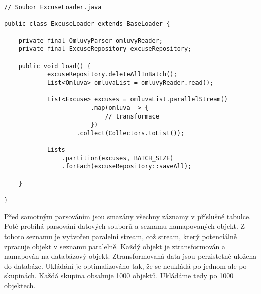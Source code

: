 \begin{lstlisting}[caption={Transformace objektu Omluva na databázový objekt Excuse}, tabsize=2]
// Soubor ExcuseLoader.java
	
public class ExcuseLoader extends BaseLoader {

    private final OmluvyParser omluvyReader;
    private final ExcuseRepository excuseRepository;

    public void load() {
			excuseRepository.deleteAllInBatch();
			List<Omluva> omluvaList = omluvyReader.read();
			
			List<Excuse> excuses = omluvaList.parallelStream()
						.map(omluva -> {
							// transformace
						})
					.collect(Collectors.toList());
				
			Lists
				.partition(excuses, BATCH_SIZE)
				.forEach(excuseRepository::saveAll);

	}

}
\end{lstlisting}

\noindent 
Před samotným parsováním jsou smazány všechny záznamy v příslušné tabulce. Poté probíhá parsování datových souborů a seznamu namapovaných objekt. Z tohoto seznamu je vytvořen paralelní stream, což stream, který potenciálně zpracuje objekt v seznamu paralelně. Každý objekt je ztransformován a namapován na databázový objekt. Ztransformovaná data jsou perzistetně uložena do databáze. Ukládání je optimalizováno tak, že se neukládá po jednom ale po skupinách. Každá skupina obsahuje 1000 objektů. Ukládáme tedy po 1000 objektech.

